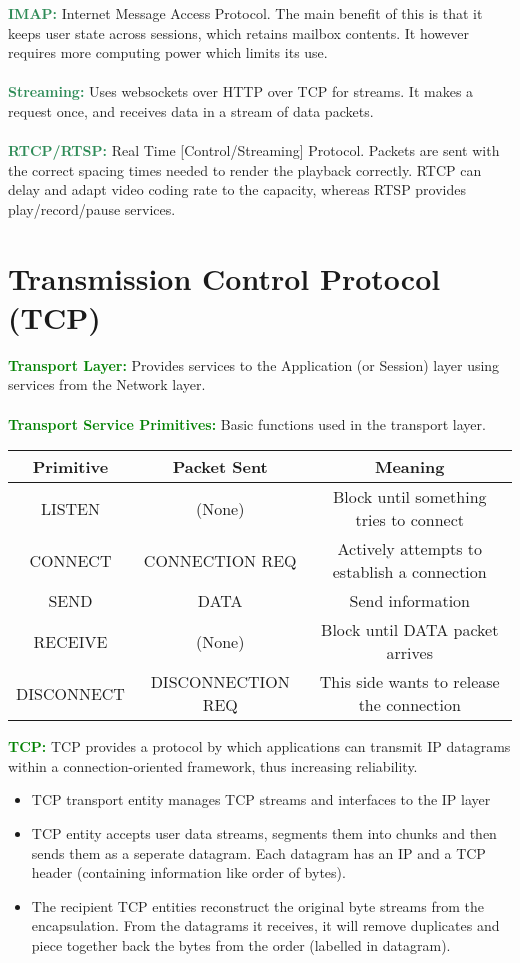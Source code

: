 \documentclass[a4paper,10pt]{article}
\begin{document}
\textcolor{SeaGreen}{\textbf{IMAP:}} Internet Message Access Protocol. The main benefit of this is that it keeps user state across sessions, which retains mailbox contents. It however requires more computing power which limits its use. \\\\
\textcolor{SeaGreen}{\textbf{Streaming:}} Uses websockets over HTTP over TCP for streams. It makes a request once, and receives data in a stream of data packets. \\\\
\textcolor{SeaGreen}{\textbf{RTCP/RTSP:}} Real Time [Control/Streaming] Protocol. Packets are sent with the correct spacing times needed to render the playback correctly. RTCP can delay and adapt video coding rate to the capacity, whereas RTSP provides play/record/pause services.
\section{Transmission Control Protocol (TCP)}
\textcolor{Green}{\textbf{Transport Layer:}} Provides services to the Application (or Session) layer using services from the Network layer. \\\\
\textcolor{Green}{\textbf{Transport Service Primitives:}} Basic functions used in the transport layer. 
\begin{center}
	\begin{tabular}{ |c|c|c| }
		\hline 
		\textbf{Primitive} &\textbf{Packet Sent} &\textbf{Meaning} \\
		\hline 
		\hline 
		LISTEN &(None) &Block until something tries to connect \\ 
		\hline
		CONNECT &CONNECTION REQ &Actively attempts to establish a connection \\
		\hline 
		SEND &DATA &Send information \\ 
		\hline 
		RECEIVE &(None) &Block until DATA packet arrives \\ 
		\hline 
		DISCONNECT &DISCONNECTION REQ &This side wants to release the connection \\ 
		\hline
	\end{tabular}
\end{center}
\newpage
\noindent \textcolor{Green}{\textbf{TCP:}} TCP provides a protocol by which applications can transmit IP datagrams within a connection-oriented framework, thus increasing reliability. 
\begin{itemize}
	\item TCP transport entity manages TCP streams and interfaces to the IP layer 
	\item TCP entity accepts user data streams, segments them into chunks and then sends them as a seperate datagram. Each datagram has an IP and a TCP header (containing information like order of bytes). 
	\item The recipient TCP entities reconstruct the original byte streams from the encapsulation. From the datagrams it receives, it will remove duplicates and piece together back the bytes from the order (labelled in datagram). 
\end{itemize}
\end{document}
